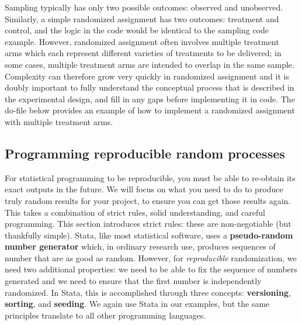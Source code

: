 
Sampling typically has only two possible outcomes: observed and unobserved.
Similarly, a simple randomized assignment has two outcomes: treatment and control,
and the logic in the code would be identical to the sampling code example.
However, randomized assignment often involves multiple treatment arms
which each represent different varieties of treatments to be delivered;
in some cases, multiple treatment arms are intended to overlap in the same sample.
Complexity can therefore grow very quickly in randomized assignment
and it is doubly important to fully understand the conceptual process
that is described in the experimental design,
and fill in any gaps before implementing it in code.
The do-file below provides an example of how to implement
a randomized assignment with multiple treatment arms.



\subsection{Programming reproducible random processes}

For statistical programming to be reproducible,
you must be able to re-obtain its exact outputs in the future.\cite{orozco2018make}
We will focus on what you need to do to produce
truly random results for your project,
to ensure you can get those results again.
This takes a combination of strict rules, solid understanding, and careful programming.
This section introduces strict rules:
these are non-negotiable (but thankfully simple).
Stata, like most statistical software, uses a \textbf{pseudo-random number generator}
which, in ordinary research use,
produces sequences of number that are as good as random.
However, for \textit{reproducible} randomization, we need two additional properties:
we need to be able to fix the sequence of numbers generated and
we need to ensure that the first number is independently randomized.
In Stata, this is accomplished through three concepts:
\textbf{versioning}, \textbf{sorting}, and \textbf{seeding}.
We again use Stata in our examples,
but the same principles translate to all other programming languages.

